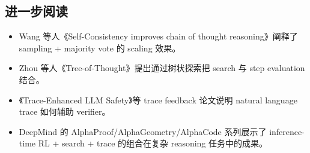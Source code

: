 \subsection{进一步阅读}
\begin{itemize}
\item Wang 等人《Self-Consistency improves chain of thought reasoning》阐释了 sampling + majority vote 的 scaling 效果。
\item Zhou 等人《Tree-of-Thought》提出通过树状探索把 search 与 step evaluation 结合。
\item 《Trace-Enhanced LLM Safety》等 trace feedback 论文说明 natural language trace 如何辅助 verifier。
\item DeepMind 的 AlphaProof/AlphaGeometry/AlphaCode 系列展示了 inference-time RL + search + trace 的组合在复杂 reasoning 任务中的成果。
\end{itemize}


